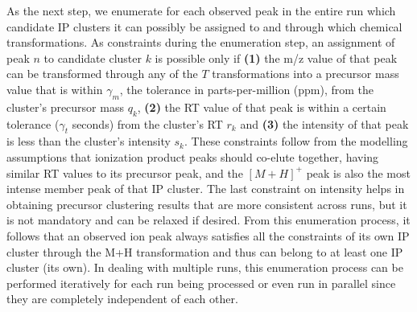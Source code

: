 As the next step, we enumerate for each observed peak in the entire run which candidate IP clusters it can possibly be assigned to and through which chemical transformations. As constraints during the enumeration step, an assignment of peak $n$ to candidate cluster $k$ is possible only if \textbf{(1)} the m/z value of that peak can be transformed through any of the $T$ transformations into a precursor mass value that is within $\gamma_m$, the tolerance in parts-per-million (ppm), from the cluster's precursor mass $q_k$, \textbf{(2)} the RT value of that peak is within a certain tolerance ($\gamma_t$ seconds) from the cluster's RT $r_k$ and \textbf{(3)} the intensity of that peak is less than the cluster's intensity $s_k$. These constraints follow from the modelling assumptions that ionization product peaks should co-elute together, having similar RT values to its precursor peak, and the $[M+H]^+$ peak is also the most intense member peak of that IP cluster. The last constraint on intensity helps in obtaining precursor clustering results that are more consistent across runs, but it is not mandatory and can be relaxed if desired. From this enumeration process, it follows that an observed ion peak always satisfies all the constraints of its own IP cluster through the M+H transformation and thus can belong to at least one IP cluster (its own). In dealing with multiple runs, this enumeration process can be performed iteratively for each run being processed or even run in parallel since they are completely independent of each other. 

